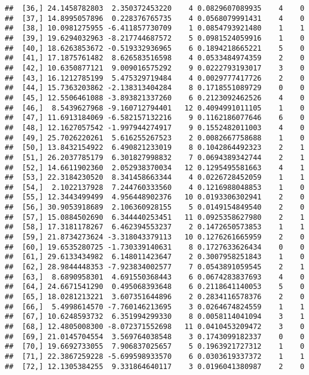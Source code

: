 \documentclass[]{article}
\begin{document}
\begin{verbatim}
##  [36,] 24.1458782803  2.350372453220    4 0.0829607089935    4    0
##  [37,] 14.8995057896  0.228376765735    4 0.0568079991431    4    0
##  [38,] 10.0981275955 -6.411857730709    1 0.0854793921480    1    1
##  [39,] 19.6294032963 -8.217744687572    5 0.0981524059916    1    0
##  [40,] 18.6263853672 -0.519332936965    6 0.1894218665221    5    0
##  [41,] 17.1875761482  8.626583516598    4 0.0533484974359    2    0
##  [42,] 10.6350877121  9.009016575292    9 0.0222793193017    3    0
##  [43,] 16.1212785199  5.475329719484    4 0.0029777417726    2    0
##  [44,] 15.7363203862 -2.138313404284    8 0.1718551089729    0    0
##  [45,] 12.5506461088 -3.893821337260    6 0.2123092462526    4    0
##  [46,]  8.5439627968 -9.160712794401   12 0.4094991011105    1    0
##  [47,] 11.6913184069 -6.582157132216    9 0.1162186077646    6    0
##  [48,] 12.1627057542 -1.997944274917    9 0.1552482011003    4    0
##  [49,] 25.7026220261  5.616255267523    2 0.0082667758688    1    0
##  [50,] 13.8432154922  6.490821233019    8 0.1042864492323    2    1
##  [51,] 26.2037785179  6.301827998832    7 0.0694389342744    2    1
##  [52,] 14.6611902360  2.052938370034   12 0.1295495581663    4    1
##  [53,] 22.3184230520  8.341458663344    4 0.0226728452059    1    1
##  [54,]  2.1022137928  7.244760333560    4 0.1216988048853    1    0
##  [55,] 12.3443499499  4.956448902376   10 0.0193306302941    2    0
##  [56,] 30.9053918689  2.106360928155    5 0.0149154849540    2    0
##  [57,] 15.0884502690  6.344440253451   11 0.0925358627980    2    1
##  [58,] 17.3181178267  6.462394553237    2 0.1472650573853    1    1
##  [59,] 21.8734273624 -3.318043379113   10 0.1276261665959    2    0
##  [60,] 19.6535280725 -1.730339140631    8 0.1727633626434    0    0
##  [61,] 29.6133434982  6.148011423647    2 0.3007958251843    1    0
##  [62,] 28.9844448353 -7.923834002577    7 0.0543891059545    2    1
##  [63,]  8.6890958301  4.691550368443    6 0.0674283837693    4    0
##  [64,] 24.6671541290  0.495068393648    6 0.2118641140053    5    0
##  [65,] 18.0281213221  3.607351644896    2 0.2834116578376    2    0
##  [66,]  5.4998614570 -7.760146213695    3 0.0264674824559    1    1
##  [67,] 10.6248593732  6.351994299330    8 0.0058114041094    3    1
##  [68,] 12.4805008300 -8.072371552698   11 0.0410453209472    3    0
##  [69,] 21.0145704554  3.569764038548    3 0.1743099182337    0    0
##  [70,] 19.6692733055  7.906837025657    5 0.1963921727312    1    0
##  [71,] 22.3867259228 -5.699598933570    6 0.0303619337372    1    1
##  [72,] 12.1305384255  9.331864640117    3 0.0196041380987    2    0

\end{verbatim}
\end{document}
